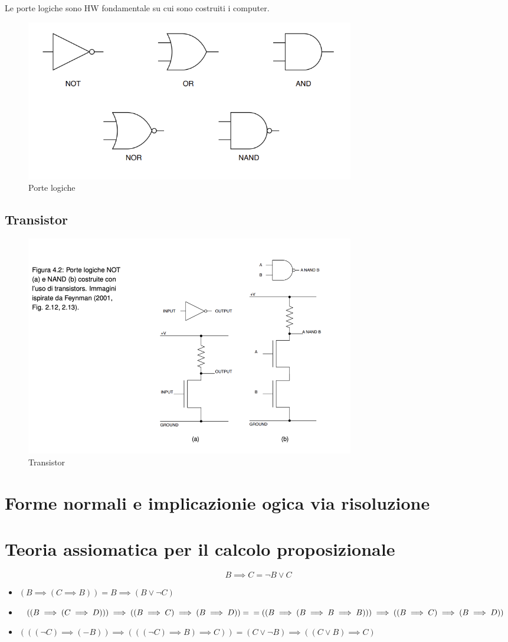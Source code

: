 \documentclass{article}
\begin{document}
Le porte logiche sono HW fondamentale su cui sono costruiti i computer.
\begin{figure}[h!]
    \centering
    \includegraphics[width=0.7\textwidth]{porte_logiche.png}
    \caption{Porte logiche}
\end{figure}

\subsection{Transistor}
\begin{figure}[h!]
    \centering
    \includegraphics[width=0.7\textwidth]{trans.png}
    \caption{Transistor}
\end{figure}

\section{Forme normali e implicazionie ogica via risoluzione}


\section{Teoria assiomatica per il calcolo proposizionale}
\[
    B\implies C = \neg B \lor C
\]
\begin{itemize}
    \item $(B\implies (C\implies B)) = B \implies (B \lor \neg C)$
    \item $((B\implies (C\implies D))) \implies ((B\implies C)\implies (B\implies D)) =\\= ((B\implies (B\implies B \implies B))) \implies ((B\implies C)\implies (B\implies D))$
    \item $(((\neg C)\implies (-B)) \implies (((\neg C)\implies B) \implies C)) = (C \lor \neg B) \implies ((C \lor B) \implies C)$
\end{itemize}
\end{document}
